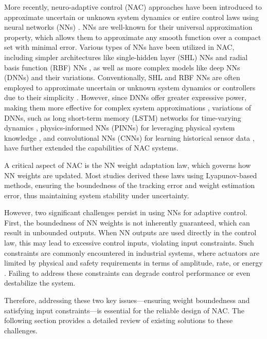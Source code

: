 \documentclass[letterpaper, journal]{IEEEtran}
\begin{document}
More recently, neuro-adaptive control (NAC) approaches have been introduced to approximate uncertain or unknown system dynamics or entire control laws using neural networks (NNs) \cite{Lewis:1998aa,Farrell:2006aa}. 
NNs are well-known for their universal approximation property, which allows them to approximate any smooth function over a compact set with minimal error. 
Various types of NNs have been utilized in NAC, including simpler architectures like single-hidden layer (SHL) NNs \cite{Lewis:1996aa,Ge:2010aa, Yesildirek:1995aa} and radial basis function (RBF) NNs \cite{Liu:2013ab,Ge:2002aa}, as well as more complex models like deep NNs (DNNs) \cite{Patil:2022aa} and their variations. 
Conventionally, SHL and RBF NNs are often employed to approximate uncertain or unknown system dynamics or controllers due to their simplicity \cite{Esfandiari:2014aa,Esfandiari:2015aa,Yesildirek:1995aa,Gao:2006aa}.
However, since DNNs offer greater expressive power, making them more effective for complex system approximations \cite{Rolnick:2018aa}, variations of DNNs, such as long short-term memory (LSTM) networks for time-varying dynamics \cite{Griffis:2023aa}, physics-informed NNs (PINNs) for leveraging physical system knowledge \cite{Hart:2024aa}, and convolutional NNs (CNNs) for learning historical sensor data \cite{Ryu:2024ac}, have further extended the capabilities of NAC systems.

A critical aspect of NAC is the NN weight adaptation law, which governs how NN weights are updated. 
Most studies derived these laws using Lyapunov-based methods, ensuring the boundedness of the tracking error and weight estimation error, thus maintaining system stability under uncertainty.

However, two significant challenges persist in using NNs for adaptive control. 
First, the boundedness of NN weights is not inherently guaranteed, which can result in unbounded outputs. 
When NN outputs are used directly in the control law, this may lead to excessive control inputs, violating input constraints. 
Such constraints are commonly encountered in industrial systems, where actuators are limited by physical and safety requirements in terms of amplitude, rate, or energy \cite{Esfandiari:2021aa}. 
Failing to address these constraints can degrade control performance or even destabilize the system.

Therefore, addressing these two key issues—ensuring weight boundedness and satisfying input constraints—is essential for the reliable design of NAC. 
The following section provides a detailed review of existing solutions to these challenges.
\end{document}
